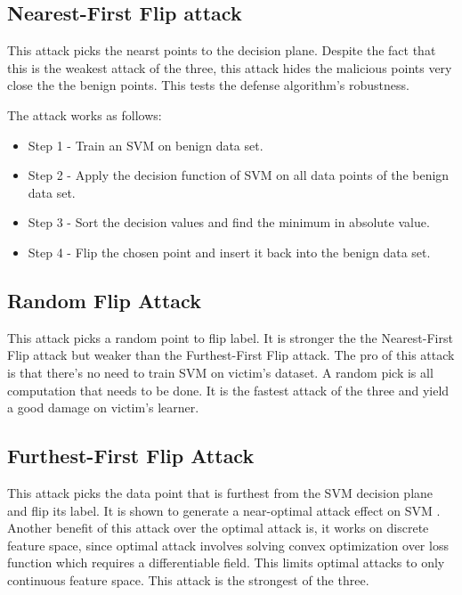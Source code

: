 \documentclass[10pt,conference,compsocconf,letterpaper]{IEEEtran}
\begin{document}
\subsection{Nearest-First Flip attack}

This attack picks the nearst points to the decision plane. Despite the fact that this is the weakest attack of the three, this attack hides the malicious points very close the the benign points. This tests the defense algorithm's robustness.

The attack works as follows:

\begin{itemize}
\item Step 1 - Train an SVM on benign data set.
\item Step 2 - Apply the decision function of SVM on all data points of the benign data set.
\item Step 3 - Sort the decision values and find the minimum in absolute value.
\item Step 4 - Flip the chosen point and insert it back into the benign data set.
\end{itemize}

\subsection{Random Flip Attack}

This attack picks a random point to flip label. It is stronger the the Nearest-First Flip attack but weaker than the Furthest-First Flip attack. The pro of this attack is that there's no need to train SVM on victim's dataset. A random pick is all computation that needs to be done. It is the fastest attack of the three and yield a good damage on victim's learner.

\subsection{Furthest-First Flip Attack}

This attack picks the data point that is furthest from the SVM decision plane and flip its label. It is shown to generate a near-optimal attack effect on SVM \cite{xiao12}. Another benefit of this attack over the optimal attack is, it works on discrete feature space, since optimal attack involves solving convex optimization over loss function which requires a differentiable field. This limits optimal attacks to only continuous feature space. This attack is the strongest of the three.
\end{document}

